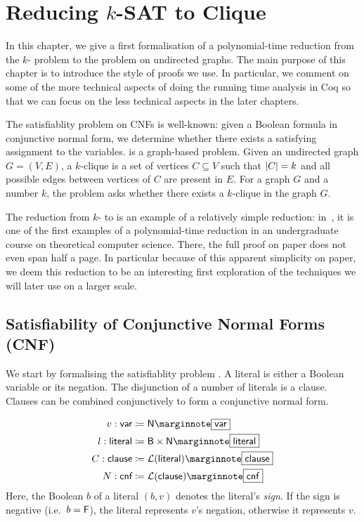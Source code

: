 \newcommand{\varBound}{\textsf{varBound}}
\newcommand{\maxVar}{\textsf{maxVar}}

\chapter{Reducing $k$-SAT to Clique}\label{chap:ksat_clique}
In this chapter, we give a first formalisation of a polynomial-time reduction from the $k$-\SAT{} problem to the \Clique{} problem on undirected graphs. The main purpose of this chapter is to introduce the style of proofs we use. In particular, we comment on some of the more technical aspects of doing the running time analysis in Coq so that we can focus on the less technical aspects in the later chapters. 

The satisfiablity problem \SAT{} on CNFs is well-known: given a Boolean formula in conjunctive normal form, we determine whether there exists a satisfying assignment to the variables. 
\Clique{} is a graph-based problem. Given an undirected graph $G = (V, E)$, a $k$-clique is a set of vertices $C \subseteq V$ such that $|C| = k$ and all possible edges between vertices of $C$ are present in $E$. For a graph $G$ and a number $k$, the \Clique{} problem asks whether there exists a $k$-clique in the graph $G$. 

The reduction from $k$-\SAT{} to \Clique{} is an example of a relatively simple reduction: in~\cite{Bläser:TISkript}, it is one of the first examples of a polynomial-time reduction in an undergraduate course on theoretical computer science. There, the full proof on paper does not even span half a page. 
In particular because of this apparent simplicity on paper, we deem this reduction to be an interesting first exploration of the techniques we will later use on a larger scale.

\section{Satisfiability of Conjunctive Normal Forms (CNF)}\label{sec:sat}
We start by formalising the satisfiablity problem \SAT{}.
A literal is either a Boolean variable or its negation. The disjunction of a number of literals is a clause. Clauses can be combined conjunctively to form a conjunctive normal form. 

\newcommand*{\bvar}{\textsf{var}}
\newcommand*{\literal}{\textsf{literal}}
\newcommand*{\clause}{\textsf{clause}}
\newcommand*{\cnf}{\textsf{cnf}}
\newcommand*{\assgn}{\textsf{assgn}}
\newcommand*{\eval}{\mathcal{E}}
\newcommand*{\evalA}[2]{\eval~#1~#2}
\begin{align*}
  v : \bvar &\defeq \nat \mnote{\bvar}\\
  l : \literal &\defeq \bool \times \nat \mnote{\literal}\\
  C : \clause &\defeq \listsof{\literal} \mnote{\clause}\\
  N : \cnf &\defeq \listsof{\clause} \mnote{\cnf}
\end{align*}
Here, the Boolean $b$ of a literal $(b, v)$ denotes the literal's \emph{sign}. If the sign is negative (i.e.\ $b = \mathsf{F}$), the literal represents $v$'s negation, otherwise it represents $v$.


